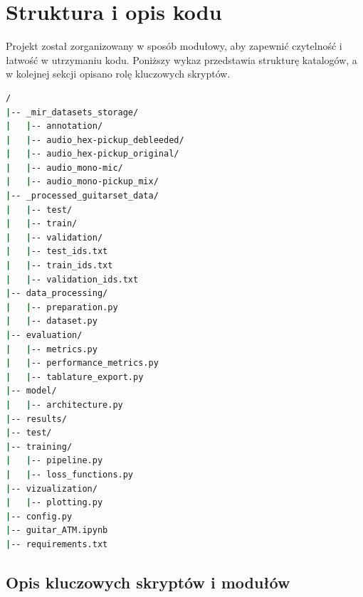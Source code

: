 \section*{Struktura i opis kodu}
\label{sec:tech_kod}

Projekt został zorganizowany w sposób modułowy, aby zapewnić czytelność i łatwość w utrzymaniu kodu. Poniższy wykaz przedstawia strukturę katalogów, a w kolejnej sekcji opisano rolę kluczowych skryptów.

\begin{lstlisting}[language=bash, caption={Wykaz struktury katalogów projektu.}, label={lst:struct}, deletekeywords={test}]
/
|-- _mir_datasets_storage/
|   |-- annotation/
|   |-- audio_hex-pickup_debleeded/
|   |-- audio_hex-pickup_original/
|   |-- audio_mono-mic/
|   |-- audio_mono-pickup_mix/
|-- _processed_guitarset_data/
|   |-- test/
|   |-- train/
|   |-- validation/
|   |-- test_ids.txt
|   |-- train_ids.txt
|   |-- validation_ids.txt
|-- data_processing/
|   |-- preparation.py
|   |-- dataset.py
|-- evaluation/
|   |-- metrics.py
|   |-- performance_metrics.py
|   |-- tablature_export.py
|-- model/
|   |-- architecture.py
|-- results/
|-- test/
|-- training/
|   |-- pipeline.py
|   |-- loss_functions.py
|-- vizualization/
|   |-- plotting.py
|-- config.py
|-- guitar_ATM.ipynb
|-- requirements.txt
\end{lstlisting}

\subsection*{Opis kluczowych skryptów i modułów}


